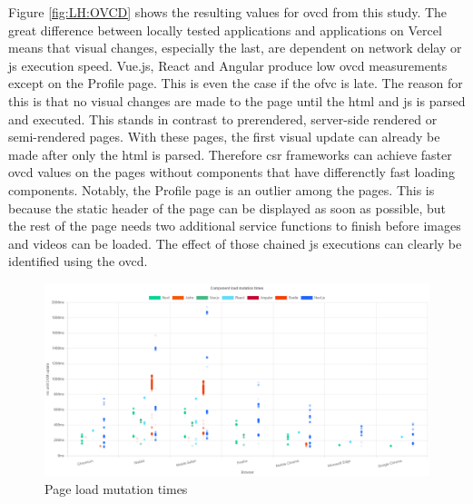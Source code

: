\documentclass[a4paper, 10pt]{article}
\begin{document}
Figure \ref{fig:LH:OVCD} shows the resulting values for \acrfull{ovcd} from this study.
The great difference between locally tested applications and applications on Vercel means that visual changes, especially the last, are dependent on network delay or \acrlong{js} execution speed.
Vue.js, React and Angular produce low \acrshort{ovcd} measurements except on the Profile page.
This is even the case if the \acrshort{ofvc} is late.
The reason for this is that no visual changes are made to the page until the \acrshort{html} and \acrshort{js} is parsed and executed.
This stands in contrast to prerendered, server-side rendered or semi-rendered pages.
With these pages, the first visual update can already be made after only the \acrshort{html} is parsed.
Therefore \acrshort{csr} frameworks can achieve faster \acrshort{ovcd} values on the pages without components that have differenctly fast loading components.
Notably, the Profile page is an outlier among the pages.
This is because the static header of the page can be displayed as soon as possible, but the rest of the page needs two additional service functions to finish before images and videos can be loaded.
The effect of those chained \acrlong{js} executions can clearly be identified using the \acrshort{ovcd}.

\begin{figure}[ht!]
  \centering
  \includegraphics[width=\linewidth, keepaspectratio]{img/playwright-results/pageLoadMutations/total.png}
  \caption{Page load mutation times}
  \label{fig:Playwright:pageLoadMutations:total}
\end{figure}
\end{document}
